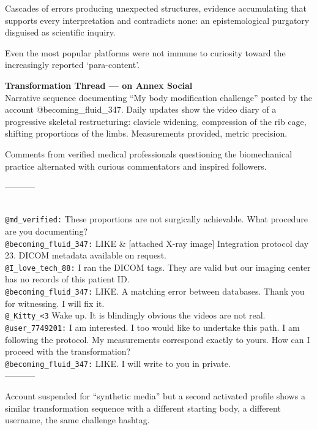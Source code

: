 Cascades of errors producing unexpected structures, evidence accumulating that supports every interpretation and contradicts none: an epistemological purgatory disguised as scientific inquiry.

Even the most popular platforms were not immune to curiosity toward the increasingly reported `para-content'.

\begin{archivefragment}

\textbf{Transformation Thread --- on Annex Social}\\
Narrative sequence documenting ``My body modification challenge'' posted by the account @becoming\_fluid\_347. Daily updates show the video diary of a progressive skeletal restructuring: clavicle widening, compression of the rib cage, shifting proportions of the limbs. Measurements provided, metric precision.

Comments from verified medical professionals questioning the biomechanical practice alternated with curious commentators and inspired followers.

-----------
\raggedright
\\
\texttt{@md\_verified:} These proportions are not surgically achievable. What procedure are you documenting?\\
\texttt{@becoming\_fluid\_347:} LIKE \& [attached X-ray image] Integration protocol day 23. DICOM metadata available on request.\\
\texttt{@I\_love\_tech\_88:} I ran the DICOM tags. They are valid but our imaging center has no records of this patient ID.\\
\texttt{@becoming\_fluid\_347:} LIKE. A matching error between databases. Thank you for witnessing. I will fix it.\\
\texttt{@\_Kitty\_<3} Wake up. It is blindingly obvious the videos are not real.\\
\texttt{@user\_7749201:} I am interested. I too would like to undertake this path. I am following the protocol. My measurements correspond exactly to yours. How can I proceed with the transformation?\\
\texttt{@becoming\_fluid\_347:} LIKE. I will write to you in private.\\
-----------

\end{archivefragment}

Account suspended for ``synthetic media'' but a second activated profile shows a similar transformation sequence with a different starting body, a different username, the same challenge hashtag.

